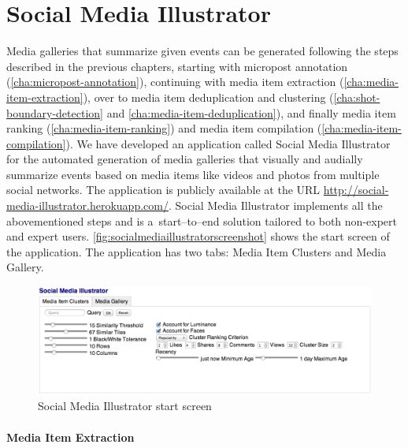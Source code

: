 \section{Social Media Illustrator}
\label{sec:socialmediaillustrator}

Media galleries that summarize given events
can be generated following the steps described in the previous chapters,
starting with micropost annotation (\autoref{cha:micropost-annotation}), continuing with media item extraction
(\autoref{cha:media-item-extraction}),
over to media item deduplication and clustering
(\autoref{cha:shot-boundary-detection} and  
\autoref{cha:media-item-deduplication}), and finally
media item ranking (\autoref{cha:media-item-ranking}) and
media item compilation (\autoref{cha:media-item-compilation}).
We have developed an application called Social Media Illustrator
for the automated generation of
media galleries that visually and audially summarize events
based on media items like videos and photos from multiple social networks.
The application is publicly available at the URL 
\url{http://social-media-illustrator.herokuapp.com/}.
Social Media Illustrator implements all the abovementioned steps
and is a~start--to--end solution tailored to both
non-expert and expert users.
\autoref{fig:socialmediaillustratorscreenshot}
shows the start screen of the application.
The application has two tabs: Media Item Clusters and Media Gallery.

\begin{figure}[!ht]
  \centering
  \includegraphics[width=1\columnwidth]{socialmediaillustrator.png}
  \caption{Social Media Illustrator start screen}
  \label{fig:socialmediaillustratorscreenshot}
\end{figure}

\paragraph{Media Item Extraction}

